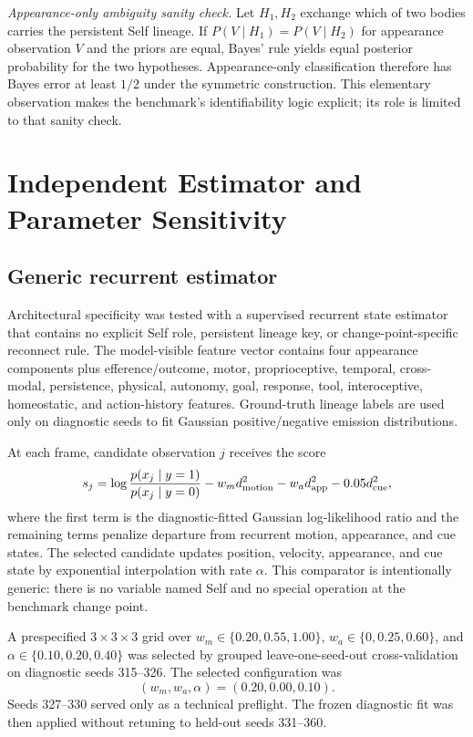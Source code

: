 \documentclass[10pt,journal,onecolumn]{IEEEtran}
\begin{document}
\noindent\emph{Appearance-only ambiguity sanity check.}
Let $H_1,H_2$ exchange which of two bodies carries the persistent Self lineage. If $P(V\mid H_1)=P(V\mid H_2)$ for appearance observation $V$ and the priors are equal, Bayes' rule yields equal posterior probability for the two hypotheses. Appearance-only classification therefore has Bayes error at least $1/2$ under the symmetric construction. This elementary observation makes the benchmark's identifiability logic explicit; its role is limited to that sanity check.

\section{Independent Estimator and Parameter Sensitivity}
\subsection{Generic recurrent estimator}
Architectural specificity was tested with a supervised recurrent state estimator that contains no explicit Self role, persistent lineage key, or change-point-specific reconnect rule. The model-visible feature vector contains four appearance components plus efference/outcome, motor, proprioceptive, temporal, cross-modal, persistence, physical, autonomy, goal, response, tool, interoceptive, homeostatic, and action-history features. Ground-truth lineage labels are used only on diagnostic seeds to fit Gaussian positive/negative emission distributions.

At each frame, candidate observation $j$ receives the score
\begin{equation}
s_j=\log\frac{p(x_j\mid y=1)}{p(x_j\mid y=0)}-w_m d_{\rm motion}^2-w_a d_{\rm app}^2-0.05d_{\rm cue}^2,
\end{equation}
where the first term is the diagnostic-fitted Gaussian log-likelihood ratio and the remaining terms penalize departure from recurrent motion, appearance, and cue states. The selected candidate updates position, velocity, appearance, and cue state by exponential interpolation with rate $\alpha$. This comparator is intentionally generic: there is no variable named Self and no special operation at the benchmark change point.

A prespecified $3\times3\times3$ grid over $w_m\in\{0.20,0.55,1.00\}$, $w_a\in\{0,0.25,0.60\}$, and $\alpha\in\{0.10,0.20,0.40\}$ was selected by grouped leave-one-seed-out cross-validation on diagnostic seeds 315--326. The selected configuration was
\begin{equation}
(w_m,w_a,\alpha)=(0.20,0.00,0.10).
\end{equation}
Seeds 327--330 served only as a technical preflight. The frozen diagnostic fit was then applied without retuning to held-out seeds 331--360.
\end{document}
